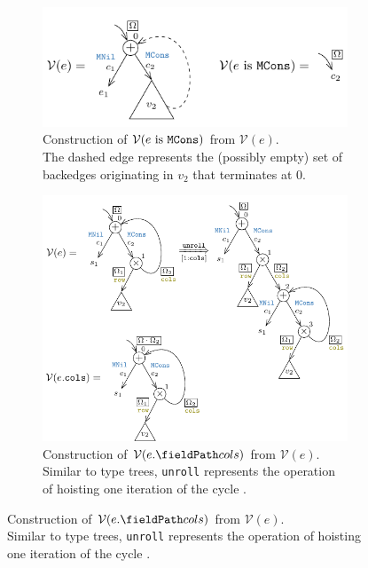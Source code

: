 \begin{figure}[H]
\begin{subfigure}[b]{\textwidth}
\begin{center}
\includegraphics[scale=1.3]{chapters/figures/figValueTreeConvSumIs.pdf}
\end{center}
\caption{\label{fig:valuetreeconvsumis} Construction of $\mathcal{V}(e\ \mathrm{is}\ {\tt MCons})$ from $\mathcal{V}(e)$.\\
The dashed edge represents the (possibly empty) set of backedges originating in $v_2$ that terminates at 0.}
\end{subfigure}
\begin{subfigure}[b]{\textwidth}
\begin{center}
\includegraphics[scale=1.3]{chapters/figures/figValueTreeConvProdAccess.pdf}
\end{center}
\caption{\label{fig:valuetreeconvprodaccess} Construction of $\mathcal{V}(\prodAccess{e}{cols})$ from $\mathcal{V}(e)$.\\
Similar to type trees, {\tt unroll}  represents the operation of hoisting one iteration of the cycle .}
\end{subfigure}
\end{figure}

